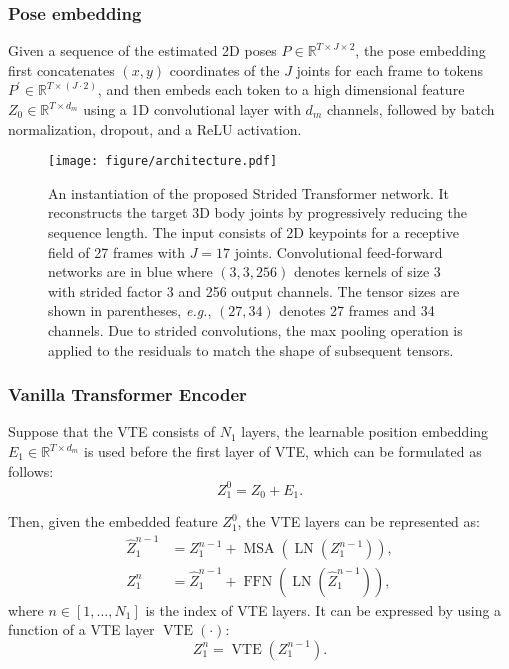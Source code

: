 \documentclass[journal]{IEEEtran}
\begin{document}
\subsubsection{Pose embedding}
Given a sequence of the estimated 2D poses $P \in \mathbb{R}^{T \times J \times 2}$, the pose embedding first concatenates $(x, y)$ coordinates of the $J$ joints for each frame to tokens $P^{\prime} \in \mathbb{R}^{T \times (J \cdot 2)}$, and then embeds each token to a high dimensional feature $Z_{0} \in \mathbb{R}^{T \times d_{m}}$ using a 1D convolutional layer with $d_{m}$ channels, followed by batch normalization, dropout, and a ReLU activation. 

\begin{figure*}[t]
   \centering
   \texttt{[image: figure/architecture.pdf]}
   \caption
   {
      An instantiation of the proposed Strided Transformer network.  
      It reconstructs the target 3D body joints by progressively reducing the sequence length. 
      The input consists of 2D keypoints for a receptive field of 27 frames with $J = 17$ joints. 
      Convolutional feed-forward networks are in blue where $(3, 3, 256)$ denotes kernels of size 3 with strided factor 3 and 256 output channels. 
      The tensor sizes are shown in parentheses, \emph{e.g.}, $(27, 34)$ denotes 27 frames and 34 channels. 
      Due to strided convolutions, the max pooling operation is applied to the residuals to match the shape of subsequent tensors.
   }
   \label{fig:architecture}
\end{figure*}

\subsubsection{Vanilla Transformer Encoder}
Suppose that the VTE consists of $N_{1}$ layers, the learnable position embedding $E_{1} \in \mathbb{R}^{T \times d_{m}}$ is used before the first layer of VTE, which can be formulated as follows: 
\begin{equation}
   Z_{1}^{0} = Z_{0} + E_{1}. 
\end{equation}

Then, given the embedded feature $Z_{1}^{0}$, the VTE layers can be represented as: 
\begin{align}
   \hat{Z}_{1}^{n-1}&=Z_{1}^{n-1}+\operatorname{MSA}(\operatorname{LN}(Z_{1}^{n-1})), \\
   Z_{1}^{n}&=\hat{Z}_{1}^{n-1}+\operatorname{FFN}(\operatorname{LN}(\hat{Z}_{1}^{n-1})),
\end{align}
where $n \in[1, \ldots, N_{1}]$ is the index of VTE layers. 
It can be expressed by using a function of a VTE layer $\operatorname{VTE}(\cdot)$: 
\begin{equation}
   Z_{1}^{n} = \operatorname{VTE}(Z_{1}^{n-1}).  
\end{equation}
\end{document}
